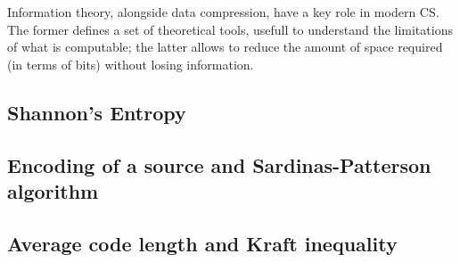 \documentclass{subfiles}
\begin{document}
    Information theory, alongside data compression,
        have a key role in modern CS. 
        The former defines a set of theoretical tools,
        usefull to understand the limitations of what is computable;
        the latter allows to reduce the amount of space required (in terms of bits)
        without losing information.

    \subsection{Shannon's Entropy}\label{Sec:1.1}
    

    \subsection[Encoding of a source]{Encoding of a source and Sardinas-Patterson algorithm}
    

    \subsection{Average code length and Kraft inequality}
    
\end{document}
